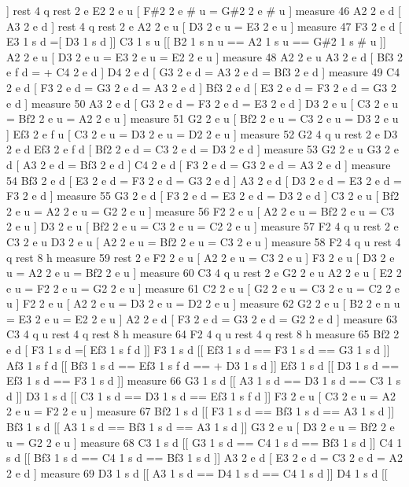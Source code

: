 \mbox{]} rest 4 q rest 2 e E2 2 e u \mbox{[} F\#2 2 e \# u = G\#2 2 e \# u \mbox{]} measure 46 A2 2 e d \mbox{[} A3 2 e d \mbox{]} rest 4 q rest 2 e A2 2 e u \mbox{[} D3 2 e u = E3 2 e u \mbox{]} measure 47 F3 2 e d \mbox{[} E3 1 s d =\mbox{[} D3 1 s d \mbox{]}\mbox{]} C3 1 s u \mbox{[}\mbox{[} B2 1 s n u == A2 1 s u == G\#2 1 s \# u \mbox{]}\mbox{]} A2 2 e u \mbox{[} D3 2 e u = E3 2 e u = E2 2 e u \mbox{]} measure 48 A2 2 e u A3 2 e d \mbox{[} Bf3 2 e f d = + C4 2 e d \mbox{]} D4 2 e d \mbox{[} G3 2 e d = A3 2 e d = Bf3 2 e d \mbox{]} measure 49 C4 2 e d \mbox{[} F3 2 e d = G3 2 e d = A3 2 e d \mbox{]} Bf3 2 e d \mbox{[} E3 2 e d = F3 2 e d = G3 2 e d \mbox{]} measure 50 A3 2 e d \mbox{[} G3 2 e d = F3 2 e d = E3 2 e d \mbox{]} D3 2 e u \mbox{[} C3 2 e u = Bf2 2 e u = A2 2 e u \mbox{]} measure 51 G2 2 e u \mbox{[} Bf2 2 e u = C3 2 e u = D3 2 e u \mbox{]} Ef3 2 e f u \mbox{[} C3 2 e u = D3 2 e u = D2 2 e u \mbox{]} measure 52 G2 4 q u rest 2 e D3 2 e d Ef3 2 e f d \mbox{[} Bf2 2 e d = C3 2 e d = D3 2 e d \mbox{]} measure 53 G2 2 e u G3 2 e d \mbox{[} A3 2 e d = Bf3 2 e d \mbox{]} C4 2 e d \mbox{[} F3 2 e d = G3 2 e d = A3 2 e d \mbox{]} measure 54 Bf3 2 e d \mbox{[} E3 2 e d = F3 2 e d = G3 2 e d \mbox{]} A3 2 e d \mbox{[} D3 2 e d = E3 2 e d = F3 2 e d \mbox{]} measure 55 G3 2 e d \mbox{[} F3 2 e d = E3 2 e d = D3 2 e d \mbox{]} C3 2 e u \mbox{[} Bf2 2 e u = A2 2 e u = G2 2 e u \mbox{]} measure 56 F2 2 e u \mbox{[} A2 2 e u = Bf2 2 e u = C3 2 e u \mbox{]} D3 2 e u \mbox{[} Bf2 2 e u = C3 2 e u = C2 2 e u \mbox{]} measure 57 F2 4 q u rest 2 e C3 2 e u D3 2 e u \mbox{[} A2 2 e u = Bf2 2 e u = C3 2 e u \mbox{]} measure 58 F2 4 q u rest 4 q rest 8 h measure 59 rest 2 e F2 2 e u \mbox{[} A2 2 e u = C3 2 e u \mbox{]} F3 2 e u \mbox{[} D3 2 e u = A2 2 e u = Bf2 2 e u \mbox{]} measure 60 C3 4 q u rest 2 e G2 2 e u A2 2 e u \mbox{[} E2 2 e u = F2 2 e u = G2 2 e u \mbox{]} measure 61 C2 2 e u \mbox{[} G2 2 e u = C3 2 e u = C2 2 e u \mbox{]} F2 2 e u \mbox{[} A2 2 e u = D3 2 e u = D2 2 e u \mbox{]} measure 62 G2 2 e u \mbox{[} B2 2 e n u = E3 2 e u = E2 2 e u \mbox{]} A2 2 e d \mbox{[} F3 2 e d = G3 2 e d = G2 2 e d \mbox{]} measure 63 C3 4 q u rest 4 q rest 8 h measure 64 F2 4 q u rest 4 q rest 8 h measure 65 Bf2 2 e d \mbox{[} F3 1 s d =\mbox{[} Ef3 1 s f d \mbox{]}\mbox{]} F3 1 s d \mbox{[}\mbox{[} Ef3 1 s d == F3 1 s d == G3 1 s d \mbox{]}\mbox{]} Af3 1 s f d \mbox{[}\mbox{[} Bf3 1 s d == Ef3 1 s f d == + D3 1 s d \mbox{]}\mbox{]} Ef3 1 s d \mbox{[}\mbox{[} D3 1 s d == Ef3 1 s d == F3 1 s d \mbox{]}\mbox{]} measure 66 G3 1 s d \mbox{[}\mbox{[} A3 1 s d == D3 1 s d == C3 1 s d \mbox{]}\mbox{]} D3 1 s d \mbox{[}\mbox{[} C3 1 s d == D3 1 s d == Ef3 1 s f d \mbox{]}\mbox{]} F3 2 e u \mbox{[} C3 2 e u = A2 2 e u = F2 2 e u \mbox{]} measure 67 Bf2 1 s d \mbox{[}\mbox{[} F3 1 s d == Bf3 1 s d == A3 1 s d \mbox{]}\mbox{]} Bf3 1 s d \mbox{[}\mbox{[} A3 1 s d == Bf3 1 s d == A3 1 s d \mbox{]}\mbox{]} G3 2 e u \mbox{[} D3 2 e u = Bf2 2 e u = G2 2 e u \mbox{]} measure 68 C3 1 s d \mbox{[}\mbox{[} G3 1 s d == C4 1 s d == Bf3 1 s d \mbox{]}\mbox{]} C4 1 s d \mbox{[}\mbox{[} Bf3 1 s d == C4 1 s d == Bf3 1 s d \mbox{]}\mbox{]} A3 2 e d \mbox{[} E3 2 e d = C3 2 e d = A2 2 e d \mbox{]} measure 69 D3 1 s d \mbox{[}\mbox{[} A3 1 s d == D4 1 s d == C4 1 s d \mbox{]}\mbox{]} D4 1 s d \mbox{[}\mbox{[} 